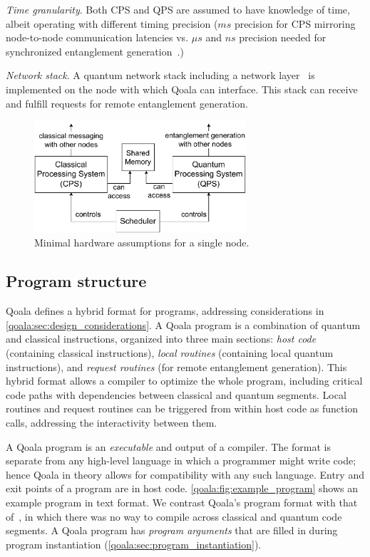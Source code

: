 \textit{Time granularity}. Both CPS and QPS are assumed to have knowledge of time, albeit operating with different timing precision ($ms$ precision for CPS mirroring node-to-node communication latencies vs. $\mu s$ and $ns$ precision needed for synchronized entanglement generation~\cite{pompili2022experimental, dahlberg2019link}.)

 \textit{Network stack}. A quantum network stack including a network layer~\cite{dahlberg2019link} is implemented on the node with which Qoala can interface. This stack can receive and fulfill requests for remote entanglement generation.
\begin{figure}
    \centering
    \includegraphics[width=0.7\textwidth]{figures/qoala/minimal-hardware.pdf}
    \caption{Minimal hardware assumptions for a single node.}
    \label{qoala:fig:minimal_hardware_assumptions}
\end{figure}



\subsection{Program structure}
\label{qoala:sec:program_structure}
Qoala defines a hybrid format for programs, addressing considerations in \cref{qoala:sec:design_considerations}.
A Qoala program is a combination of quantum and classical instructions, 
organized into three main sections: \textit{host code} (containing classical instructions), \textit{local routines} (containing local quantum instructions), 
and \textit{request routines} (for remote entanglement generation).
This hybrid format allows a compiler to optimize the whole program, including critical code paths with dependencies between classical and quantum segments.
Local routines and request routines can be triggered from within host code as function calls, addressing the interactivity between them.

A Qoala program is an \textit{executable} and output of a compiler.
The format is separate from any high-level language in which a programmer might write code; hence Qoala in theory allows for compatibility with any such language.
Entry and exit points of a program are in host code.
\cref{qoala:fig:example_program} shows an example program in text format.
We contrast Qoala's program format with that of~\cite{dahlberg2022netqasm}, in which there was no way to compile across classical and quantum code segments.
A Qoala program has \textit{program arguments} that are filled in during program instantiation (\cref{qoala:sec:program_instantiation}).



